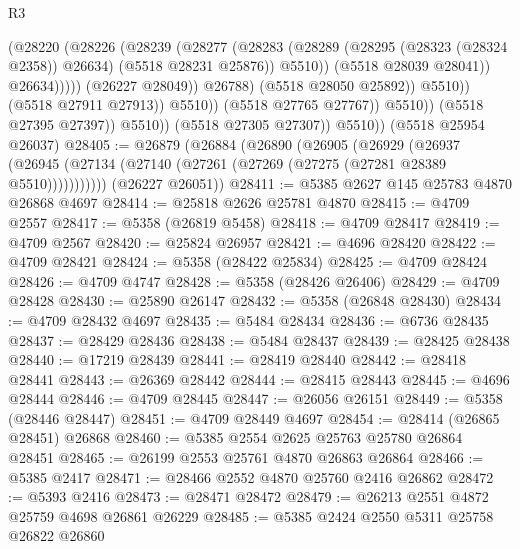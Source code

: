 \begin{lexlean}{R3}
\begin{coremodule}
                                            (@28220
                                              (@28226
                                                (@28239
                                                  (@28277
                                                    (@28283
                                                      (@28289
                                                        (@28295 (@28323 (@28324 @2358)) @26634)
                                                        (@5518 @28231 @25876))
                                                      @5510))
                                                  (@5518 @28039 @28041))
                                                @26634)))))
                                      (@26227 @28049))
                                    @26788)
                                  (@5518 @28050 @25892))
                                @5510))
                            (@5518 @27911 @27913))
                          @5510))
                      (@5518 @27765 @27767))
                    @5510))
                (@5518 @27395 @27397))
              @5510))
          (@5518 @27305 @27307))
        @5510))
    (@5518 @25954 @26037)
@28405 := @26879
    (@26884
      (@26890
        (@26905
          (@26929
            (@26937 (@26945 (@27134 (@27140 (@27261 (@27269 (@27275 (@27281 @28389 @5510)))))))))))
      (@26227 @26051))
@28411 := @5385 @2627 @145 @25783 @4870 @26868 @4697
@28414 := @25818 @2626 @25781 @4870
@28415 := @4709 @2557
@28417 := @5358 (@26819 @5458)
@28418 := @4709 @28417
@28419 := @4709 @2567
@28420 := @25824 @26957
@28421 := @4696 @28420
@28422 := @4709 @28421
@28424 := @5358 (@28422 @25834)
@28425 := @4709 @28424
@28426 := @4709 @4747
@28428 := @5358 (@28426 @26406)
@28429 := @4709 @28428
@28430 := @25890 @26147
@28432 := @5358 (@26848 @28430)
@28434 := @4709 @28432 @4697
@28435 := @5484 @28434
@28436 := @6736 @28435
@28437 := @28429 @28436
@28438 := @5484 @28437
@28439 := @28425 @28438
@28440 := @17219 @28439
@28441 := @28419 @28440
@28442 := @28418 @28441
@28443 := @26369 @28442
@28444 := @28415 @28443
@28445 := @4696 @28444
@28446 := @4709 @28445
@28447 := @26056 @26151
@28449 := @5358 (@28446 @28447)
@28451 := @4709 @28449 @4697
@28454 := @28414 (@26865 @28451) @26868
@28460 := @5385 @2554 @2625 @25763 @25780 @26864 @28451
@28465 := @26199 @2553 @25761 @4870 @26863 @26864
@28466 := @5385 @2417
@28471 := @28466 @2552 @4870 @25760 @2416 @26862
@28472 := @5393 @2416
@28473 := @28471 @28472
@28479 := @26213 @2551 @4872 @25759 @4698 @26861 @26229
@28485 := @5385 @2424 @2550 @5311 @25758 @26822 @26860

\end{coremodule}
\end{lexlean}
